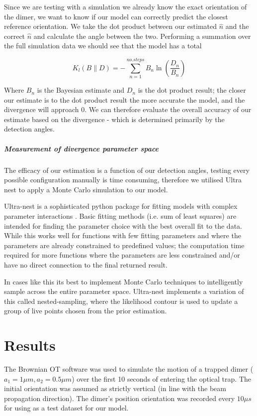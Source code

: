 \documentclass[11pt]{article}
\begin{document}
Since we are testing with a simulation we already know the exact orientation of the dimer, we want to know if our model can correctly predict the closest reference orientation. We take the dot product between our estimated $\hat{n}$ and the correct $\hat{n}$ and calculate the angle between the two. Performing a summation over the full simulation data we should see that the model has a total  

$$  K_l(B \parallel D) = - \sum_{n=1}^{no. steps} B_n \ln(\frac{D_n}{B_n})$$


Where $B_n$ is the Bayesian estimate and $D_n$ is the dot product result; the closer our estimate is to the dot product result the more accurate the model, and the divergence will approach 0. We can therefore evaluate the overall accuracy of our estimate based on the divergence - which is determined primarily by the detection angles. 

\subparagraph*{Measurement of divergence parameter space}
The efficacy of our estimation is a function of our detection angles, testing every possible configuration manually is time consuming, therefore we utilised Ultra nest to apply a Monte Carlo simulation to our model. 

Ultra-nest is a sophisticated python package for fitting models with complex parameter interactions \cite{3}. Basic fitting methods (i.e. sum of least squares) are intended for finding the parameter choice with the best overall fit to the data. While this works well for functions with few fitting parameters and where the parameters are already constrained to predefined values; the computation time required for more functions where the parameters are less constrained and/or have no direct connection to the final returned result. 

In cases like this its best to implement Monte Carlo techniques to intelligently sample across the entire parameter space. Ultra-nest implements a variation of this called nested-sampling, where the likelihood contour is used to update a group of live points chosen from the prior estimation.

\section*{Results}
The Brownian OT software was used to simulate the motion of a trapped dimer ($a_1=1\mu m, a_2=0.5\mu m$) over the first 10 seconds of entering the optical trap. The initial orientation was assumed as strictly vertical (in line with the beam propagation direction). The dimer's position orientation was recorded every $10 \mu s$ for using as a test dataset for our model. 
\end{document}
